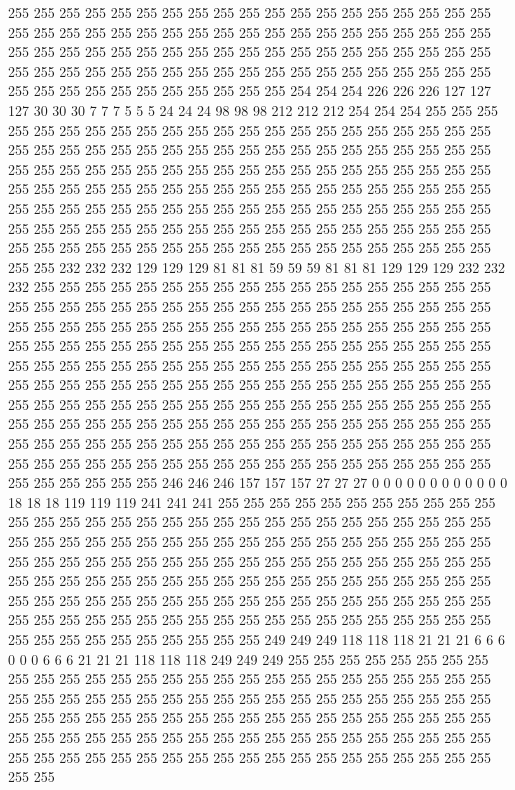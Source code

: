 255 255 255 255 255 255 255 255 255 255 255 255 255 255 255 255 255 255 255 255 255 255 255 255 255 255 255 255 255 255 255 255 255 255 255 255 255 255 255 255 255 255 255 255 255 255 255 255 255 255 255 255 255 255 255 255 255 255 255 255 255 255 255 255 255 255 255 255 255 255 255 255 255 255 255 255 255 255 255 255 255 255 255 255 255 255 255 254 254 254 226 226 226 127 127 127 30 30 30 7 7 7 5 5 5 24 24 24 98 98 98 212 212 212 254 254 254 255 255 255 255 255 255 255 255 255 255 255 
255 255 255 255 255 255 255 255 255 255 255 255 255 255 255 255 255 255 255 255 255 255 255 255 255 255 255 255 255 255 255 255 255 255 255 255 255 255 255 255 255 255 255 255 255 255 255 255 255 255 255 255 255 255 255 255 255 255 255 255 255 255 255 255 255 255 255 255 255 255 255 255 255 255 255 255 255 255 255 255 255 255 255 255 255 255 255 255 255 255 255 255 255 255 255 255 255 255 255 255 255 255 255 255 255 255 255 255 255 255 255 255 255 255 255 255 255 255 255 255 255 255 255 255 255 255 255 232 
232 232 129 129 129 81 81 81 59 59 59 81 81 81 129 129 129 232 232 232 255 255 255 255 255 255 255 255 255 255 255 255 255 255 255 255 255 255 255 255 255 255 255 255 255 255 255 255 255 255 255 255 255 255 255 255 255 255 255 255 255 255 255 255 255 255 255 255 255 255 255 255 255 255 255 255 255 255 255 255 255 255 255 255 255 255 255 255 255 255 255 255 255 255 255 255 255 255 255 255 255 255 255 255 255 255 255 255 255 255 255 255 255 255 255 255 255 255 255 255 255 255 255 255 255 255 255 255 
255 255 255 255 255 255 255 255 255 255 255 255 255 255 255 255 255 255 255 255 255 255 255 255 255 255 255 255 255 255 255 255 255 255 255 255 255 255 255 255 255 255 255 255 255 255 255 255 255 255 255 255 255 255 255 255 255 255 255 255 255 255 255 255 255 255 255 255 255 255 255 255 255 255 255 255 255 255 255 255 255 255 255 255 255 255 255 246 246 246 157 157 157 27 27 27 0 0 0 0 0 0 0 0 0 0 0 0 18 18 18 119 119 119 241 241 241 255 255 255 255 255 255 255 255 255 255 255 
255 255 255 255 255 255 255 255 255 255 255 255 255 255 255 255 255 255 255 255 255 255 255 255 255 255 255 255 255 255 255 255 255 255 255 255 255 255 255 255 255 255 255 255 255 255 255 255 255 255 255 255 255 255 255 255 255 255 255 255 255 255 255 255 255 255 255 255 255 255 255 255 255 255 255 255 255 255 255 255 255 255 255 255 255 255 255 255 255 255 255 255 255 255 255 255 255 255 255 255 255 255 255 255 255 255 255 255 255 255 255 255 255 255 255 255 255 255 255 255 255 255 255 255 249 249 249 118 
118 118 21 21 21 6 6 6 0 0 0 6 6 6 21 21 21 118 118 118 249 249 249 255 255 255 255 255 255 255 255 255 255 255 255 255 255 255 255 255 255 255 255 255 255 255 255 255 255 255 255 255 255 255 255 255 255 255 255 255 255 255 255 255 255 255 255 255 255 255 255 255 255 255 255 255 255 255 255 255 255 255 255 255 255 255 255 255 255 255 255 255 255 255 255 255 255 255 255 255 255 255 255 255 255 255 255 255 255 255 255 255 255 255 255 255 255 255 255 255 255 255 255 255 255 255 255 255 
